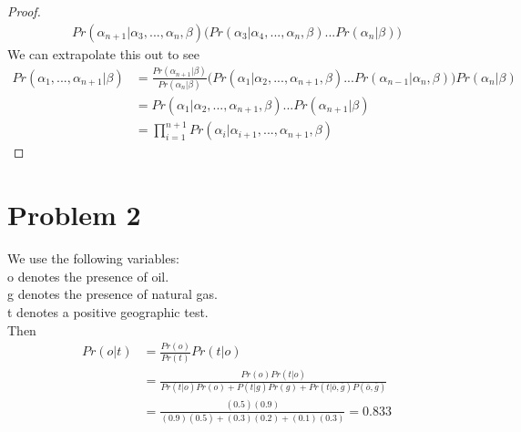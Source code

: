 \documentclass{article}
\begin{document}
\begin{proof}
\begin{align*}
				Pr(\alpha_{n+1} | \alpha_3, ..., \alpha_n, \beta)
				\biggr(Pr(\alpha_3 | \alpha_4, ..., \alpha_n, \beta) ... Pr(\alpha_n | \beta) \biggr)
	\end{align*}
	We can extrapolate this out to see
	\begin{align*}
		Pr(\alpha_1, ..., \alpha_{n+1} | \beta) 
			&= \frac {Pr(\alpha_{n+1} | \beta)}  {Pr(\alpha_n |\beta)}
				\biggr( Pr(\alpha_1 | \alpha_2, ..., \alpha_{n+1}, \beta) ... Pr(\alpha_{n-1} | \alpha_n, \beta) \biggr)
				 Pr( \alpha_n | \beta) \\
			&= Pr(\alpha_1 | \alpha_2, ..., \alpha_{n+1}, \beta) ... Pr(\alpha_{n+1} | \beta) \\
			&= \prod_{i=1}^{n+1} Pr(\alpha_i | \alpha_{i+1}, ..., \alpha_{n+1}, \beta)
	\end{align*}\end{proof}
\clearpage

\section*{Problem 2}
We use the following variables: \\
\indent o denotes the presence of oil. \\
\indent g denotes the presence of natural gas. \\
\indent t denotes a positive geographic test.\\
Then \begin{align*}Pr(o | t)
	&= \frac {Pr(o)} {Pr(t)} Pr(t | o) \\
	&= \frac {Pr(o) Pr(t | o)} {Pr(t | o) Pr (o) + P(t | g) Pr(g) + Pr(t | \bar o, \bar g) P(\bar o, \bar g)} \\
	&= \frac {(0.5) (0.9)} {(0.9) (0.5) + (0.3) (0.2) + (0.1) (0.3)} = 0.833
\end{align*}
\clearpage
\end{document}
